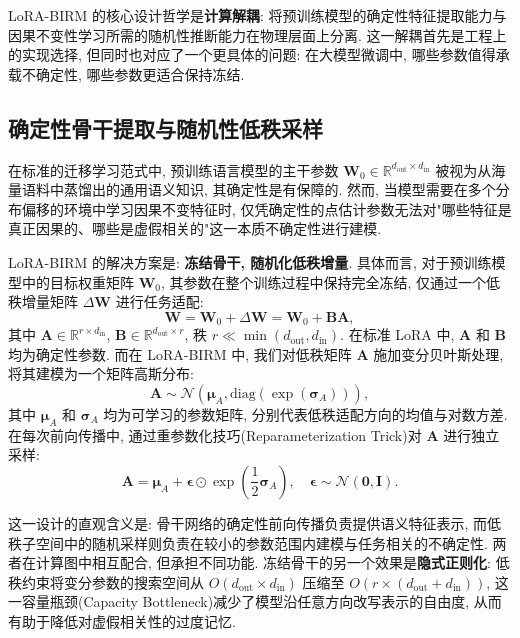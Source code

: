 \documentclass[a4paper,punct=banjiao,twoside]{ctexrep}
\theoremstyle{plain}
\theoremstyle{definition}
\theoremstyle{remark}
\begin{document}
LoRA-BIRM 的核心设计哲学是\textbf{计算解耦}: 将预训练模型的确定性特征提取能力与因果不变性学习所需的随机性推断能力在物理层面上分离. 这一解耦首先是工程上的实现选择, 但同时也对应了一个更具体的问题: 在大模型微调中, 哪些参数值得承载不确定性, 哪些参数更适合保持冻结.

\subsection{确定性骨干提取与随机性低秩采样}

在标准的迁移学习范式中, 预训练语言模型的主干参数 $\mathbf{W}_0 \in \mathbb{R}^{d_{\text{out}} \times d_{\text{in}}}$ 被视为从海量语料中蒸馏出的通用语义知识, 其确定性是有保障的. 然而, 当模型需要在多个分布偏移的环境中学习因果不变特征时, 仅凭确定性的点估计参数无法对"哪些特征是真正因果的、哪些是虚假相关的"这一本质不确定性进行建模.

LoRA-BIRM 的解决方案是: \textbf{冻结骨干, 随机化低秩增量}. 具体而言, 对于预训练模型中的目标权重矩阵 $\mathbf{W}_0$, 其参数在整个训练过程中保持完全冻结, 仅通过一个低秩增量矩阵 $\Delta \mathbf{W}$ 进行任务适配:
\begin{equation}
    \mathbf{W} = \mathbf{W}_0 + \Delta \mathbf{W} = \mathbf{W}_0 + \mathbf{B} \mathbf{A},
\end{equation}
其中 $\mathbf{A} \in \mathbb{R}^{r \times d_{\text{in}}}$, $\mathbf{B} \in \mathbb{R}^{d_{\text{out}} \times r}$, 秩 $r \ll \min(d_{\text{out}}, d_{\text{in}})$. 在标准 LoRA 中, $\mathbf{A}$ 和 $\mathbf{B}$ 均为确定性参数. 而在 LoRA-BIRM 中, 我们对低秩矩阵 $\mathbf{A}$ 施加变分贝叶斯处理, 将其建模为一个矩阵高斯分布:
\begin{equation}
    \mathbf{A} \sim \mathcal{N}(\boldsymbol{\mu}_A, \text{diag}(\exp(\boldsymbol{\sigma}_A))),
\end{equation}
其中 $\boldsymbol{\mu}_A$ 和 $\boldsymbol{\sigma}_A$ 均为可学习的参数矩阵, 分别代表低秩适配方向的均值与对数方差. 在每次前向传播中, 通过重参数化技巧(Reparameterization Trick)对 $\mathbf{A}$ 进行独立采样:
\begin{equation}
    \mathbf{A} = \boldsymbol{\mu}_A + \boldsymbol{\epsilon} \odot \exp\!\left(\frac{1}{2}\boldsymbol{\sigma}_A\right), \quad \boldsymbol{\epsilon} \sim \mathcal{N}(\mathbf{0}, \mathbf{I}).
\end{equation}

这一设计的直观含义是: 骨干网络的确定性前向传播负责提供语义特征表示, 而低秩子空间中的随机采样则负责在较小的参数范围内建模与任务相关的不确定性. 两者在计算图中相互配合, 但承担不同功能. 冻结骨干的另一个效果是\textbf{隐式正则化}: 低秩约束将变分参数的搜索空间从 $O(d_{\text{out}} \times d_{\text{in}})$ 压缩至 $O(r \times (d_{\text{out}} + d_{\text{in}}))$, 这一容量瓶颈(Capacity Bottleneck)减少了模型沿任意方向改写表示的自由度, 从而有助于降低对虚假相关性的过度记忆.
\end{document}

